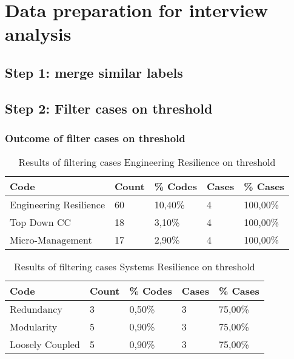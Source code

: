 \appendix
\chapter{Data preparation for interview analysis}

\section{Step 1: merge similar labels}


\section{Step 2: Filter cases on threshold}



\subsection{Outcome of filter cases on threshold}

\begin{table}[H]
	\centering
	\begin{tabular}{lllll}
		\toprule
		\textbf{Code} & \textbf{Count} & \textbf{\% Codes} &\textbf{Cases} & \textbf{\% Cases} \\
		\midrule
		Engineering Resilience & 60    & 10,40\% & 4     & 100,00\% \\
		Top Down CC & 18    & 3,10\% & 4     & 100,00\% \\
		Micro-Management & 17    & 2,90\% & 4     & 100,00\% \\
		\bottomrule
	\end{tabular}%
	\caption{Results of filtering cases Engineering Resilience on threshold}%
	\label{tab:resultsfilteringengineeringresilience}%
\end{table}%

\begin{table}[H]
	\centering
	\begin{tabular}{lllll}
		\toprule
		\textbf{Code} & \textbf{Count} & \textbf{\% Codes} &\textbf{Cases} & \textbf{\% Cases} \\
		\midrule
		Redundancy & 3     & 0,50\% & 3     & 75,00\% \\
		Modularity & 5     & 0,90\% & 3     & 75,00\% \\
		Loosely Coupled & 5     & 0,90\% & 3     & 75,00\% \\
		\bottomrule
	\end{tabular}%
	\caption{Results of filtering cases Systems Resilience on threshold}%
	\label{tab:resultsfilteringsystemsresilience}%
\end{table}%

